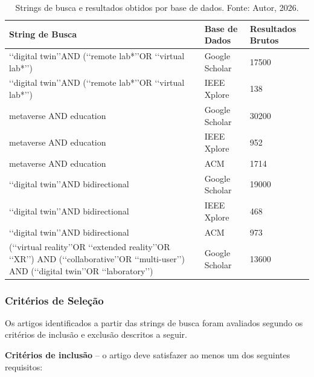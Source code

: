 \documentclass[12pt]{article}
\begin{document}
\begin{table}[h]
    \centering
    \caption{Strings de busca e resultados obtidos por base de dados. Fonte: Autor, 2026.}
    \begin{tabular}{| p{6cm} | p{1.65cm} | p{2.25cm} |}
        \hline
        \textbf{String de Busca} & \textbf{Base de Dados} & \textbf{Resultados Brutos} \\ \hline
        \lq\lq digital twin\rq\rq AND (\lq\lq remote lab*\rq\rq OR \lq\lq virtual lab*\rq\rq) & Google Scholar & 17500 \\ \hline
        \lq\lq digital twin\rq\rq AND (\lq\lq remote lab*\rq\rq OR \lq\lq virtual lab*\rq\rq) & IEEE Xplore & 138 \\ \hline
        metaverse AND education & Google Scholar & 30200 \\ \hline
        metaverse AND education & IEEE Xplore & 952 \\ \hline
        metaverse AND education & ACM & 1714 \\ \hline
        \lq\lq digital twin\rq\rq AND bidirectional & Google Scholar & 19000 \\ \hline
        \lq\lq digital twin\rq\rq AND bidirectional & IEEE Xplore & 468 \\ \hline
        \lq\lq digital twin\rq\rq AND bidirectional & ACM & 973 \\ \hline
        (\lq\lq virtual reality\rq\rq OR \lq\lq extended reality\rq\rq OR \lq\lq XR\rq\rq) AND (\lq\lq collaborative\rq\rq OR \lq\lq multi-user\rq\rq) AND (\lq\lq digital twin\rq\rq OR \lq\lq laboratory\rq\rq) & Google Scholar & 13600 \\ \hline
    \end{tabular}
    \label{tab:search_strings}
\end{table}

\subsubsection{Critérios de Seleção}
\label{criterios}

Os artigos identificados a partir das strings de busca foram avaliados segundo os critérios de inclusão e exclusão descritos a seguir.

\textbf{Critérios de inclusão} -- o artigo deve satisfazer ao menos um dos seguintes requisitos:
\end{document}
